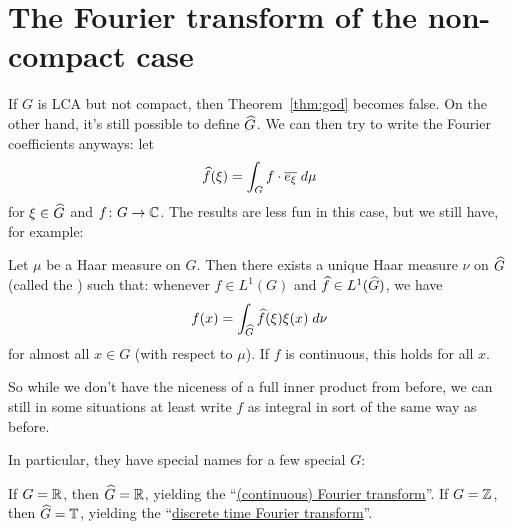 \section{The Fourier transform of the non-compact case}
If $G$ is LCA but not compact, then Theorem~\ref{thm:god} becomes false.
On the other hand, it's still possible to define $\widehat G$.
We can then try to write the Fourier coefficients anyways:
let \[ \widehat f(\xi) = \int_G f \cdot \overline{e_\xi} \; d\mu \]
for $\xi \in \widehat G$ and $f \colon G \to \mathbb C$.
The results are less fun in this case, but we still have, for example:
\begin{theorem}
	Let $\mu$ be a Haar measure on $G$.
	Then there exists a unique Haar measure $\nu$ on $\widehat G$
	(called the ) such that:
	whenever $f \in L^1(G)$ and $\widehat f \in L^1(\widehat G)$, we have
	\[ f(x) = \int_{\widehat G} \widehat f(\xi) \xi(x) \; d\nu \]
	for almost all $x \in G$ (with respect to $\mu$).
	If $f$ is continuous, this holds for all $x$.
\end{theorem}
So while we don't have the niceness of a full inner product from before,
we can still in some situations at least write $f$ as integral
in sort of the same way as before.

In particular, they have special names for a few special $G$:
\begin{itemize}
	\ii If $G = \mathbb R$, then $\widehat G = \mathbb R$,
	yielding the
	``\href{https://en.wikipedia.org/wiki/Fourier_transform}{(continuous) Fourier transform}''.
	\ii If $G = \mathbb Z$, then $\widehat G = \mathbb T$,
	yielding the
	``\href{https://en.wikipedia.org/wiki/Discrete-time_Fourier_transform}{discrete time Fourier transform}''.
\end{itemize}

